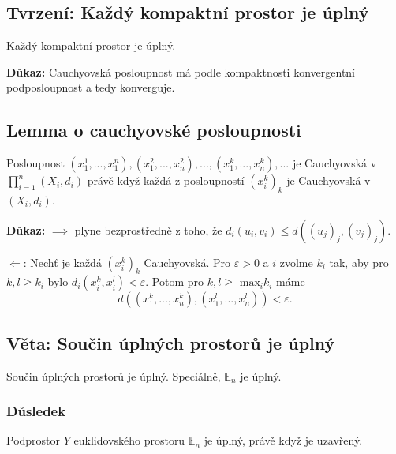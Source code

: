 \documentclass[../main.tex]{subfiles}
\begin{document}
\subsection{Tvrzení: Každý kompaktní prostor je úplný}
\hspace{1.2mm}
\noindent
Každý kompaktní prostor je úplný.

\vspace{5mm}
\noindent
\textbf{Důkaz:} Cauchyovská posloupnost má podle kompaktnosti konvergentní podposloupnost a tedy konverguje.

\subsection{Lemma o cauchyovské posloupnosti}
\hspace{1.2mm}
\noindent
Posloupnost $(x_{1}^{1}, ... , x_{1}^{n}), (x_{1}^{2},...,x_{n}^{2}), ...,(x_{1}^{k},...,x_{n}^{k}),...$
je Cauchyovská v $\prod_{i=1}^{n}(X_i, d_i)$ právě když každá z posloupností $(x_{i}^{k})_k$ je
Cauchyovská v $(X_i, d_i)$.

\vspace{5mm}
\noindent
\textbf{Důkaz:} $\implies$ plyne bezprostředně z toho, že $d_i(u_i,v_i) \leq d((u_j)_j,(v_j)_j).$

$\Leftarrow$: Nechť je každá $(x_i^k)_k$ Cauchyovská. Pro $\varepsilon > 0$ a $i$ zvolme $k_i$ tak,
aby pro $k,l \geq k_i$ bylo $d_i(x_i^k, x_i^l) < \varepsilon.$ Potom pro $k,l \geq$ $\text{max}_i k_i$ máme 
\[d((x_1^k,...,x_n^k),(x_1^l,...,x_n^l)) < \varepsilon.\]

\subsection{Věta: Součin úplných prostorů je úplný }
\hspace{1.2mm}
\noindent
Součin úplných prostorů je úplný. Speciálně, $\mathbb{E}_n$ je úplný.

\subsubsection{Důsledek}
\hspace{1.2mm}
\noindent
Podprostor $Y$ euklidovského prostoru $\mathbb{E}_n$ je úplný, právě když je uzavřený.
\end{document}
